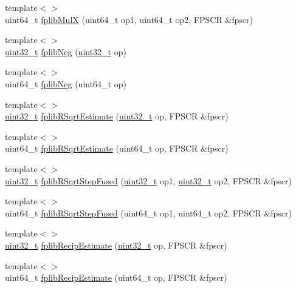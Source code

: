 \begin{DoxyCompactItemize}
\item 
{\footnotesize template$<$$>$ }\\uint64\_\-t \hyperlink{namespaceArmISA_afe97f5706de61e00c4f093937991b79c}{fplibMulX} (uint64\_\-t op1, uint64\_\-t op2, FPSCR \&fpscr)
\item 
{\footnotesize template$<$$>$ }\\\hyperlink{Type_8hh_a435d1572bf3f880d55459d9805097f62}{uint32\_\-t} \hyperlink{namespaceArmISA_ab5b770580085f7dac4b6f4b89b790980}{fplibNeg} (\hyperlink{Type_8hh_a435d1572bf3f880d55459d9805097f62}{uint32\_\-t} op)
\item 
{\footnotesize template$<$$>$ }\\uint64\_\-t \hyperlink{namespaceArmISA_aeb18f5e163418323be5a8ddea3e390e5}{fplibNeg} (uint64\_\-t op)
\item 
{\footnotesize template$<$$>$ }\\\hyperlink{Type_8hh_a435d1572bf3f880d55459d9805097f62}{uint32\_\-t} \hyperlink{namespaceArmISA_af7a6eda02787e25034d915f9b2bc1269}{fplibRSqrtEstimate} (\hyperlink{Type_8hh_a435d1572bf3f880d55459d9805097f62}{uint32\_\-t} op, FPSCR \&fpscr)
\item 
{\footnotesize template$<$$>$ }\\uint64\_\-t \hyperlink{namespaceArmISA_a2de808db4046cfa989a9ed16cb2b8017}{fplibRSqrtEstimate} (uint64\_\-t op, FPSCR \&fpscr)
\item 
{\footnotesize template$<$$>$ }\\\hyperlink{Type_8hh_a435d1572bf3f880d55459d9805097f62}{uint32\_\-t} \hyperlink{namespaceArmISA_a101a644231829e76613bfeef72004f89}{fplibRSqrtStepFused} (\hyperlink{Type_8hh_a435d1572bf3f880d55459d9805097f62}{uint32\_\-t} op1, \hyperlink{Type_8hh_a435d1572bf3f880d55459d9805097f62}{uint32\_\-t} op2, FPSCR \&fpscr)
\item 
{\footnotesize template$<$$>$ }\\uint64\_\-t \hyperlink{namespaceArmISA_a42463571963b5c39d18b6bec17137464}{fplibRSqrtStepFused} (uint64\_\-t op1, uint64\_\-t op2, FPSCR \&fpscr)
\item 
{\footnotesize template$<$$>$ }\\\hyperlink{Type_8hh_a435d1572bf3f880d55459d9805097f62}{uint32\_\-t} \hyperlink{namespaceArmISA_abde99661be8e680808632aea977225f6}{fplibRecipEstimate} (\hyperlink{Type_8hh_a435d1572bf3f880d55459d9805097f62}{uint32\_\-t} op, FPSCR \&fpscr)
\item 
{\footnotesize template$<$$>$ }\\uint64\_\-t \hyperlink{namespaceArmISA_acbf845d772e3ee728e4b76f7002c81f6}{fplibRecipEstimate} (uint64\_\-t op, FPSCR \&fpscr)

\end{DoxyCompactItemize}
